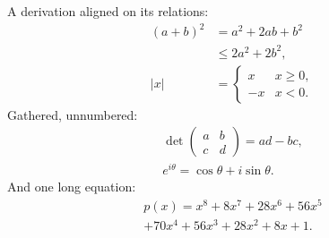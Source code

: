 \documentclass{article}
\begin{document}
A derivation aligned on its relations:
\begin{align}
  (a+b)^2 &= a^2 + 2ab + b^2 \\
          &\le 2a^2 + 2b^2, \\
  \lvert x \rvert &= \begin{cases} x & x \ge 0, \\ -x & x < 0. \end{cases}
\end{align}
Gathered, unnumbered:
\begin{gather*}
  \det\begin{pmatrix} a & b \\ c & d \end{pmatrix} = ad - bc, \\
  e^{i\theta} = \cos\theta + i \sin\theta.
\end{gather*}
And one long equation:
\begin{multline}
  p(x) = x^8 + 8x^7 + 28x^6 + 56x^5 \\ + 70x^4 + 56x^3 + 28x^2 + 8x + 1.
\end{multline}
\end{document}
